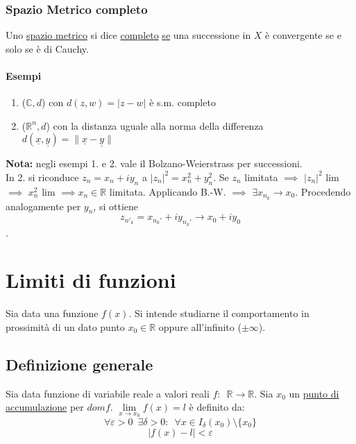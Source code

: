 \documentclass[10pt, oneside]{book}
\theoremstyle{plain}
\begin{document}
\subsection{Spazio Metrico completo}
\begin{defin}
Uno \hyperlink{metrico}{spazio metrico} si dice \underline{completo} \underline{se} una successione in $X$ è convergente se e solo se è di Cauchy.
\end{defin}
\subsubsection{Esempi}
\begin{enumerate}
    \item ($\mathbb{C}, d$) con $d(z,w) = |z - w|$ è s.m. completo
    \item ($\mathbb{R}^n, d$) con la distanza uguale alla norma della differenza $d(\underline{x}, \underline{y}) = \lVert \underline{x} - \underline{y} \rVert$
\end{enumerate}
\textbf{Nota:} negli esempi 1. e 2. vale il Bolzano-Weierstrass per successioni.\\
In 2. si riconduce $z_n = x_n + i y_n$ a 
$|z_n|^2 = x_n^2 + y_n^2$. 
Se $z_n$ limitata $\implies$ $|z_n|^2$ lim 
$\implies$ $x_n^2$ lim $\implies x_n \in \mathbb{R}$ limitata.
Applicando B.-W. $\implies$ $\exists x_{n_k} \rightarrow x_0$.
Procedendo analogamente per $y_n$, si ottiene \[z_{n'_k} = x_{n_k'} + i y_{n_k'} \longrightarrow x_0 + i y_0\].

\chapter{Limiti di funzioni}
Sia data una funzione $f(x)$. Si intende studiarne il comportamento in prossimità di un dato punto $x_0 \in \mathbb{R}$ oppure all'infinito ($\pm \infty$).

\section{Definizione generale}
\begin{defin}
Sia data funzione di variabile reale a valori reali $f : \enspace \mathbb{R} \rightarrow \mathbb{R}$. Sia $x_0$ un \hyperlink{accumulaz}{punto di accumulazione} per $dom f$. $\lim \limits_{x \rightarrow x_0} f(x) = l$ è definito da:
\[\forall \varepsilon > 0 \enspace \exists \delta > 0 : \enspace \forall x \in I_{\delta}(x_0) \setminus \{x_0\}\]
\[|f(x) - l| < \varepsilon\]
\end{defin}
\end{document}
